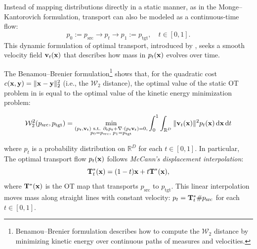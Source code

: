 Instead of mapping distributions directly in a static manner, as in the Monge--Kantorovich formulation, transport can also be modeled as a continuous-time flow:
\begin{equation*}
    p_0 := p_{\mathrm{src}} \to p_t \to p_1 := p_{\mathrm{tgt}}, \quad t \in [0,1].
\end{equation*}
This dynamic formulation of optimal transport, introduced by \citet{benamou2000computational}, seeks a smooth velocity field $ {\mathbf{v}}_t({\mathbf{x}}) $ that describes how mass in $ p_t({\mathbf{x}}) $ evolves over time.

The Benamou--Brenier formulation\footnote{Benamou–Brenier formulation describes how to compute the $ \mathcal{W}_2 $ distance by minimizing kinetic energy over continuous paths of measures and velocities.} shows that, for the quadratic cost $ c({\mathbf{x}}, {\mathbf{y}}) = \|{\mathbf{x}} - {\mathbf{y}}\|_2^2 $ (i.e., the $ \mathcal{W}_2 $ distance), the optimal value of the static OT problem in  is equal to the optimal value of the kinetic energy minimization problem:
\begin{mdframed}
   \begin{equation}\label{eq:bb-ot}
    \mathcal{W}_2^2(p_{\mathrm{src}}, p_{\mathrm{tgt}}) = \min_{\substack{ (p_t, {\mathbf{v}}_t) \text{ s.t. }
        \partial_t p_t + \nabla \cdot (p_t {\mathbf{v}}_t) = 0, \\
        p_0 = p_{\mathrm{src}},\,\, p_1 = p_{\mathrm{tgt}}
    }}
    \int_0^1 \int_{\mathbb{R}^D} \|{\mathbf{v}}_t({\mathbf{x}})\|^2 p_t({\mathbf{x}}) \mathop{}\!\mathrm{d}{\mathbf{x}} \mathop{}\!\mathrm{d} t
\end{equation} 
\end{mdframed}
where $p_t$ is a probability distribution on $\mathbb{R}^D$ for each $t \in [0,1]$. In particular, The optimal transport flow $p_t({\mathbf{x}})$ follows \textit{McCann’s displacement interpolation}:
\begin{equation*}
    {\mathbf{T}}_t^*({\mathbf{x}}) = (1 - t){\mathbf{x}} + t{\mathbf{T}}^*({\mathbf{x}}),
\end{equation*}
where ${\mathbf{T}}^*({\mathbf{x}})$ is the OT map that transports $p_{\mathrm{src}}$ to $p_{\mathrm{tgt}}$. This linear interpolation moves mass along straight lines with constant velocity: $p_t = {\mathbf{T}}_t^*\#p_{\mathrm{src}}$ for each $t \in [0,1]$. 

